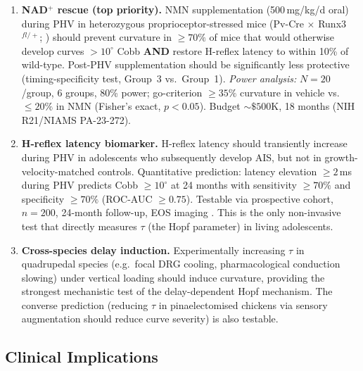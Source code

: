 \documentclass[12pt, letterpaper]{article}
\begin{document}
\begin{enumerate}[label=\textbf{P\arabic*.}]

  \item \textbf{NAD$^{+}$ rescue (top priority).} NMN supplementation
    (500\,mg/kg/d oral) during PHV in heterozygous proprioceptor-stressed mice
    (Pv-Cre $\times$ Runx3$^{fl/+}$; \citealt{Blecher2017}) should prevent
    curvature in $\geq 70\%$ of mice that would otherwise develop curves $>10^{\circ}$
    Cobb \textbf{AND} restore H-reflex latency to within 10\% of wild-type.
    Post-PHV supplementation should be significantly less protective
    (timing-specificity test, Group~3 vs.\ Group~1). \textit{Power analysis:}
    $N=20$/group, 6 groups, 80\% power; go-criterion $\geq 35\%$ curvature in
    vehicle vs.\ $\leq 20\%$ in NMN (Fisher's exact, $p < 0.05$).
    Budget $\sim\$500$K, 18 months (NIH R21/NIAMS PA-23-272).

  \item \textbf{H-reflex latency biomarker.} H-reflex latency should transiently
    increase during PHV in adolescents who subsequently develop AIS, but not in
    growth-velocity-matched controls. Quantitative prediction: latency elevation
    $\geq 2$\,ms during PHV predicts Cobb $\geq 10^{\circ}$ at 24 months with
    sensitivity $\geq 70\%$ and specificity $\geq 70\%$ (ROC-AUC $\geq 0.75$).
    Testable via prospective cohort, $n=200$, 24-month follow-up, EOS imaging
    \citep{Dubousset2003}. This is the only non-invasive test that directly
    measures $\tau$ (the Hopf parameter) in living adolescents.

  \item \textbf{Cross-species delay induction.} Experimentally increasing $\tau$
    in quadrupedal species (e.g.\ focal DRG cooling, pharmacological conduction
    slowing) under vertical loading should induce curvature, providing the
    strongest mechanistic test of the delay-dependent Hopf mechanism.
    The converse prediction (reducing $\tau$ in pinaelectomised chickens via
    sensory augmentation should reduce curve severity) is also testable.

\end{enumerate}

\subsection{Clinical Implications}
\end{document}
